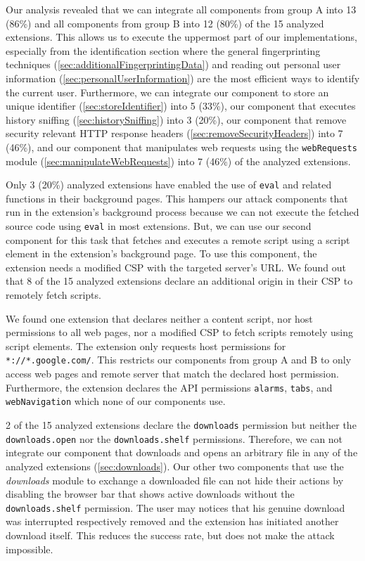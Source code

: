 	Our analysis revealed that we can integrate all components from group A into 13 (86\%) and all components from group B into 12 (80\%) of the 15 analyzed extensions. This allows us to execute the uppermost part of our implementations, especially from the identification section where the general fingerprinting techniques (\autoref{sec:additionalFingerprintingData}) and reading out personal user information (\autoref{sec:personalUserInformation}) are the most efficient ways to identify the current user. Furthermore, we can integrate our component to store an unique identifier (\autoref{sec:storeIdentifier}) into 5 (33\%), our component that executes history sniffing (\autoref{sec:historySniffing}) into 3 (20\%), our component that remove security relevant HTTP response headers (\autoref{sec:removeSecurityHeaders}) into 7 (46\%), and our component that manipulates web requests using the \texttt{webRequests} module (\autoref{sec:manipulateWebRequests}) into 7 (46\%) of the analyzed extensions.
	
	Only 3 (20\%) analyzed extensions have enabled the use of \texttt{eval} and related functions in their background pages. This hampers our attack components that run in the extension's background process because we can not execute the fetched source code using \texttt{eval} in most extensions. But, we can use our second component for this task that fetches and executes a remote script using a script element in the extension's background page. To use this component, the extension needs a modified CSP with the targeted server's URL. We found out that 8 of the 15 analyzed extensions declare an additional origin in their CSP to remotely fetch scripts. 
	
	We found one extension that declares neither a content script, nor host permissions to all web pages, nor a modified CSP to fetch scripts remotely using script elements. The extension only requests host permissions for \texttt{*://*.google.com/}. This restricts our components from group A and B to only access web pages and remote server that match the declared host permission. Furthermore, the extension declares the API permissions \texttt{alarms}, \texttt{tabs}, and \texttt{webNavigation} which none of our components use. %

	2 of the 15 analyzed extensions declare the \texttt{downloads} permission but neither the \texttt{downloads.open} nor the \texttt{downloads.shelf} permissions. Therefore, we can not integrate our component that downloads and opens an arbitrary file in any of the analyzed extensions (\autoref{sec:downloads}). Our other two components that use the \textit{downloads} module to exchange a downloaded file can not hide their actions by disabling the browser bar that shows active downloads without the \texttt{downloads.shelf} permission. The user may notices that his genuine download was interrupted respectively removed and the extension has initiated another download itself. This reduces the success rate, but does not make the attack impossible.
	
